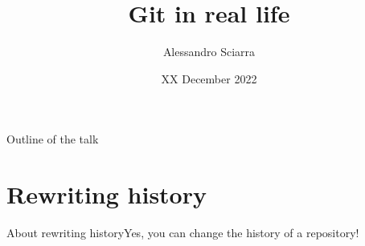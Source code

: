 \documentclass[usenames,svgnames,14pt]{beamer}
\title{Git in real life}
\date{XX December 2022}
\author{Alessandro Sciarra}
\institute{Z02~--~Software Development Center}
\begin{document}
\begin{frame}
    \titlepage
\end{frame}
\begin{frame}{Outline of the talk}
    \tableofcontents[subsectionstyle=hide]
\end{frame}


\section{Rewriting history}
\begin{frame}{About rewriting history}{Yes, you can change the history of a repository!}
\begin{overlayarea}{\textwidth}{0.3\textheight}


\end{overlayarea}
\end{frame}
\end{document}
